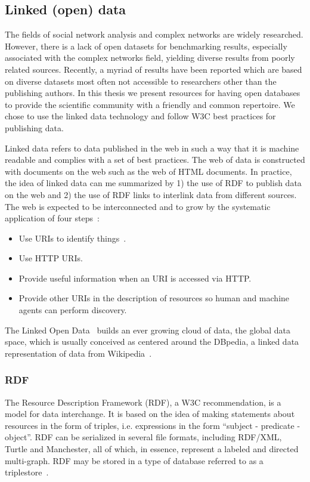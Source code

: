 \subsection{Linked (open) data}
The fields of social network analysis and complex networks
are widely researched.
However, there is a lack of open datasets for benchmarking results,
especially associated with the complex networks field,
yielding diverse results from poorly related sources.
Recently, a myriad of results have been reported which are based on
diverse datasets most often not accessible to researchers other than the publishing authors.
In this thesis we present resources for having open databases to provide 
the scientific community with a friendly and common repertoire.
We chose to use the linked data technology and follow W3C best practices for publishing data.

Linked data refers to data published in the web in such a way that it is
machine readable and complies with a set of best practices.
The web of data is constructed with documents on the web 
such as the web of HTML documents.
In practice, the idea of linked data can me summarized
by 1) the use of RDF to publish data on the web and 2) the use of RDF
links to interlink data from different sources.
The web is expected to be interconnected and to grow by the systematic application of four
steps~\cite{lee1}:
\begin{itemize}
\item Use URIs to identify things~\cite{uri}.
\item Use HTTP URIs.
\item Provide useful information when an URI is accessed via HTTP.
\item Provide other URIs in the description of resources so human
and machine agents can perform discovery.
\end{itemize}

The Linked Open Data~\cite{lod} builds an ever growing cloud of data,
the global data space, which is usually
conceived as centered around the DBpedia, a linked data representation
of data from Wikipedia~\cite{dbpedia0,dbpedia}.

\subsubsection{RDF}
The Resource Description Framework (RDF), a W3C
recommendation, is a model for data
interchange.
It is based on the idea of making statements about resources in the form
of triples, i.e. expressions in the form ``subject - predicate -
object''.
RDF can be serialized in several file formats, including RDF/XML,
Turtle and Manchester, all of which, in essence, represent a labeled and
directed multi-graph.
RDF may be stored in a type of database referred to as a triplestore~\cite{rdf}.

